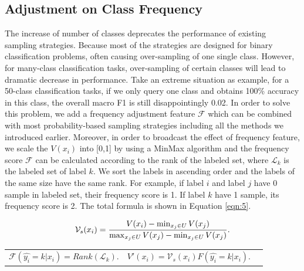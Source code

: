 \subsection{Adjustment on Class Frequency}
\label{sec:classfreq}
The increase of number of classes deprecates the performance of
existing sampling strategies. Because most of the strategies are designed 
for binary classification problems, often causing over-sampling of 
one single class. However, for many-class classification tasks, 
over-sampling of certain classes will lead to dramatic decrease in performance. 
Take an extreme situation as example, for a 50-class classification tasks, 
if we only query one class and obtains 100\% accuracy in this class, 
the overall macro F1 is still disappointingly 0.02. 
In order to solve this problem, we add a frequency adjustment feature 
$\mathcal{F}$ which can be combined with most probability-based 
sampling strategies including all the methods we introduced earlier. 
Moreover, in order to broadcast the effect of frequency feature, 
we scale the $V(x_i)$ into [0,1] by using a MinMax algorithm and the frequency score $\mathcal{F}$ can be calculated according to the rank of the labeled set, where $\mathcal{L}_k$ is the labeled set of label $k$. We sort the labels in ascending order and the labels of the same size have the same rank. For example, if label $i$ and label $j$ have 0 sample in labeled set, their frequency score is 1. If label $k$ have 1 sample, its frequency score is 2. The total formula is shown in Equation \ref{eqn:5}.

\begin{equation}
\scriptsize
\small
\mathcal{V}_s(x_i) = \frac{V(x_i)-\min_{x_j\in U}V(x_j)}{\max_{x_j\in U}V(x_j) - \min_{x_j\in U}V(x_j)}. 
\label{eqn:3}
\end{equation}

\begin{tabularx}{\textwidth}{@{}XXX@{}}%
    \scriptsize
    \small
    \begin{equation}
    \mathcal{F}(\hat{y_i} = k|x_i) = Rank(\mathcal{L}_k).  
    \label{eqn:4} 
    \end{equation}&
    \small
    \begin{equation}
    V'(x_i) = \mathcal{V}_s(x_i)F(\hat{y_i} = k|x_i).
     \label{eqn:5} 
    \end{equation}
\end{tabularx}



